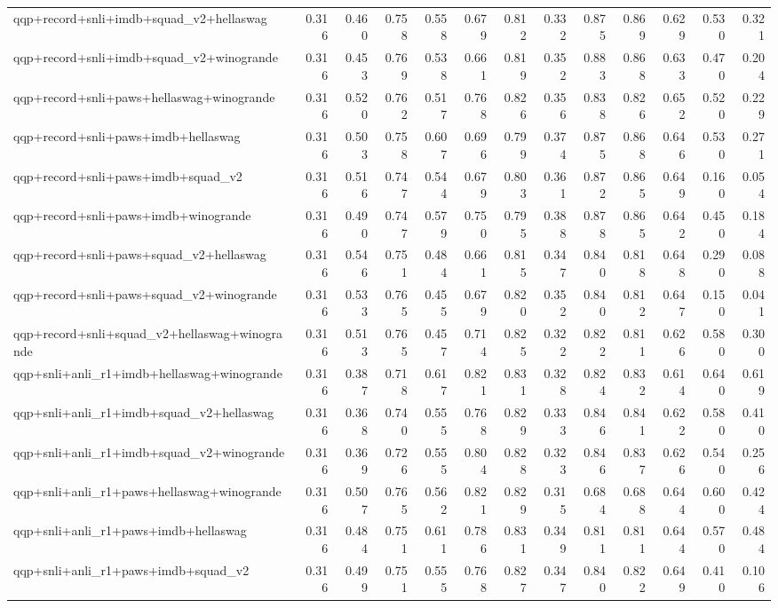 \begin{table}[t]
\begin{tabular}{lrrrrrrrrrrrr}
    qqp+record+snli+imdb+squad\_v2+hellaswag & 0.316 & 0.460 & 0.758 & 0.558 & 0.679 & 0.812 & 0.332 & 0.875 & 0.869 & 0.629 & 0.530 & 0.321 \\
    qqp+record+snli+imdb+squad\_v2+winogrande & 0.316 & 0.453 & 0.769 & 0.538 & 0.661 & 0.819 & 0.352 & 0.883 & 0.868 & 0.633 & 0.470 & 0.204 \\
    qqp+record+snli+paws+hellaswag+winogrande & 0.316 & 0.520 & 0.762 & 0.517 & 0.768 & 0.826 & 0.356 & 0.838 & 0.826 & 0.652 & 0.520 & 0.229 \\
    qqp+record+snli+paws+imdb+hellaswag & 0.316 & 0.503 & 0.758 & 0.607 & 0.696 & 0.799 & 0.374 & 0.875 & 0.868 & 0.646 & 0.530 & 0.271 \\
    qqp+record+snli+paws+imdb+squad\_v2 & 0.316 & 0.516 & 0.747 & 0.544 & 0.679 & 0.803 & 0.361 & 0.872 & 0.865 & 0.649 & 0.160 & 0.054 \\
    qqp+record+snli+paws+imdb+winogrande & 0.316 & 0.490 & 0.747 & 0.579 & 0.750 & 0.795 & 0.388 & 0.878 & 0.865 & 0.642 & 0.450 & 0.184 \\
    qqp+record+snli+paws+squad\_v2+hellaswag & 0.316 & 0.546 & 0.751 & 0.484 & 0.661 & 0.815 & 0.347 & 0.840 & 0.818 & 0.648 & 0.290 & 0.088 \\
    qqp+record+snli+paws+squad\_v2+winogrande & 0.316 & 0.533 & 0.765 & 0.455 & 0.679 & 0.820 & 0.352 & 0.840 & 0.812 & 0.647 & 0.150 & 0.041 \\
    qqp+record+snli+squad\_v2+hellaswag+winogrande & 0.316 & 0.513 & 0.765 & 0.457 & 0.714 & 0.825 & 0.322 & 0.822 & 0.811 & 0.626 & 0.580 & 0.300 \\
    qqp+snli+anli\_r1+imdb+hellaswag+winogrande & 0.316 & 0.387 & 0.718 & 0.617 & 0.821 & 0.831 & 0.328 & 0.824 & 0.832 & 0.614 & 0.640 & 0.619 \\
    qqp+snli+anli\_r1+imdb+squad\_v2+hellaswag & 0.316 & 0.368 & 0.740 & 0.555 & 0.768 & 0.829 & 0.333 & 0.846 & 0.841 & 0.622 & 0.580 & 0.410 \\
    qqp+snli+anli\_r1+imdb+squad\_v2+winogrande & 0.316 & 0.369 & 0.726 & 0.555 & 0.804 & 0.828 & 0.323 & 0.846 & 0.837 & 0.626 & 0.540 & 0.256 \\
    qqp+snli+anli\_r1+paws+hellaswag+winogrande & 0.316 & 0.507 & 0.765 & 0.562 & 0.821 & 0.829 & 0.315 & 0.684 & 0.688 & 0.644 & 0.600 & 0.424 \\
    qqp+snli+anli\_r1+paws+imdb+hellaswag & 0.316 & 0.484 & 0.751 & 0.611 & 0.786 & 0.831 & 0.349 & 0.811 & 0.811 & 0.644 & 0.570 & 0.484 \\
    qqp+snli+anli\_r1+paws+imdb+squad\_v2 & 0.316 & 0.499 & 0.751 & 0.555 & 0.768 & 0.827 & 0.347 & 0.840 & 0.822 & 0.649 & 0.410 & 0.106 \\

\end{tabular}
\end{table}
